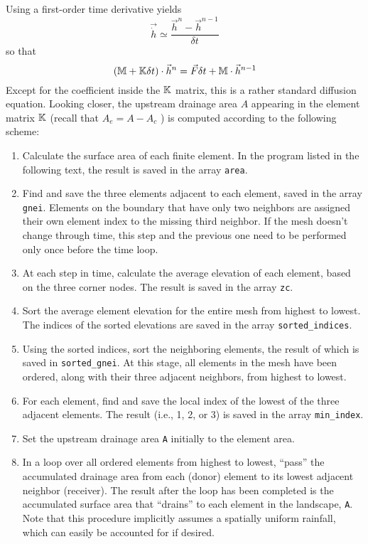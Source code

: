 Using a first-order time derivative yields
\[
\vec{\dot h} \simeq \frac{\vec{h}^n-\vec{h}^{n-1}}{\delta t}
\]
so that 
\[
({\mathbb{M}}  + {\mathbb{K}} \delta t ) \cdot \vec{h}^n = \vec{F} \delta t  + {\mathbb{M}} \cdot \vec{h}^{n-1}
\]
Except for the coefficient inside the ${\mathbb{K}}$ matrix, this is a rather standard diffusion equation. 
Looking closer, the upstream drainage area $A$ appearing in the element matrix ${\mathbb{K}}$ 
(recall that $A_e = A - A_c$ ) is computed according to the following scheme:
\begin{enumerate}
\item Calculate the surface area of each finite element. In the program listed in the following text, the
result is saved in the array {\tt area}.
\item Find and save the three elements adjacent to each element, 
saved in the array {\tt gnei}. 
Elements on the boundary that have only two neighbors are assigned their own element index to the missing
third neighbor. If the mesh doesn't change through time, this step and the previous one need to
be performed only once before the time loop.
\item  At each step in time, calculate the average elevation of each element, based on the three corner
nodes. The result is saved in the array {\tt zc}.
\item Sort the average element elevation for the entire mesh from highest to lowest. The indices of the
sorted elevations are saved in the array {\tt sorted\_indices}.
\item Using the sorted indices, sort the neighboring elements, the result of which is saved in
{\tt sorted\_gnei}. At this stage, all elements in the mesh have been ordered, along with their three
adjacent neighbors, from highest to lowest.
\item For each element, find and save the local index of the lowest of the three adjacent elements. The
result (i.e., 1, 2, or 3) is saved in the array {\tt min\_index}.
\item Set the upstream drainage area {\tt A} initially to the element area.
\item In a loop over all ordered elements from highest to lowest, ``pass'' the accumulated drainage area
from each (donor) element to its lowest adjacent neighbor (receiver). The result after the loop has
been completed is the accumulated surface area that ``drains'' to each element in the landscape, {\tt A}. 
Note that this procedure implicitly assumes a spatially uniform rainfall, which can easily be
accounted for if desired.
\end{enumerate}

